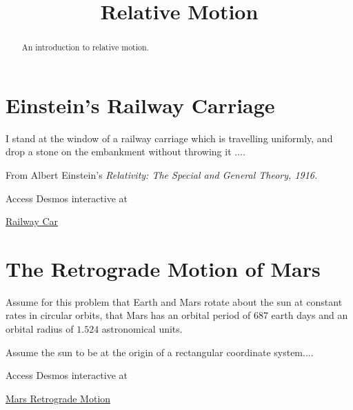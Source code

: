 \documentclass{ximera}
\title{Relative Motion}
\begin{document}
\begin{abstract}
An introduction to relative motion.
\end{abstract}
\maketitle

\section{Einstein's Railway Carriage}

I stand at the window of a railway carriage which is travelling uniformly, and drop a stone on the embankment without throwing it ....

From Albert Einstein's \it{Relativity: The Special and General Theory}, 1916.


\begin{exploration} \label{Edsss4tDE}

Access Desmos interactive at
 
\href{https://www.desmos.com/calculator/vyxsrjx0kp}{Railway Car}

 
\begin{onlineOnly}
    \begin{center}
\end{center}
\end{onlineOnly}


\end{exploration}



\section{The Retrograde Motion of Mars}

\begin{exploration}  \label{Ed6t6yhh}
Assume for this problem that Earth and Mars rotate about the sun at constant rates in circular orbits, that Mars has an orbital period of 687 earth days and an orbital radius of $1.524$ astronomical units.

Assume the sun to be at the origin of a rectangular coordinate system....

Access Desmos interactive at
 
\href{https://www.desmos.com/calculator/6qjy0mzuis}{Mars Retrograde Motion}

 
\begin{onlineOnly}
    \begin{center}
\end{center}
\end{onlineOnly}


\end{exploration}
\end{document}
